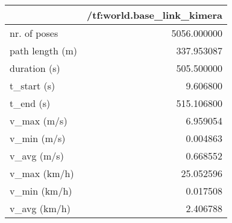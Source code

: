 \begin{tabular}{lr}
\toprule
{} &  /tf:world.base\_link\_kimera \\
\midrule
nr. of poses    &                 5056.000000 \\
path length (m) &                  337.953087 \\
duration (s)    &                  505.500000 \\
t\_start (s)     &                    9.606800 \\
t\_end (s)       &                  515.106800 \\
v\_max (m/s)     &                    6.959054 \\
v\_min (m/s)     &                    0.004863 \\
v\_avg (m/s)     &                    0.668552 \\
v\_max (km/h)    &                   25.052596 \\
v\_min (km/h)    &                    0.017508 \\
v\_avg (km/h)    &                    2.406788 \\
\bottomrule
\end{tabular}

